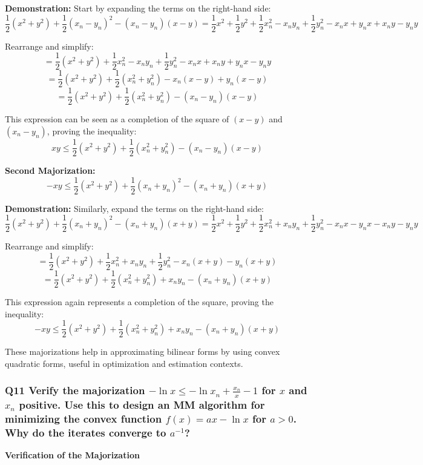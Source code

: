 \documentclass[8pt]{article}
\begin{document}
{\textbf{Demonstration:}
Start by expanding the terms on the right-hand side:
\[
\frac{1}{2} (x^2 + y^2) + \frac{1}{2} (x_n - y_n)^2 - (x_n - y_n)(x - y) = \frac{1}{2} x^2 + \frac{1}{2} y^2 + \frac{1}{2} x_n^2 - x_ny_n + \frac{1}{2} y_n^2 - x_nx + y_nx + x_ny - y_ny
\]

Rearrange and simplify:
\[
= \frac{1}{2} (x^2 + y^2) + \frac{1}{2} x_n^2 - x_ny_n + \frac{1}{2} y_n^2 - x_nx + x_ny + y_nx - y_ny
\]
\[
= \frac{1}{2} (x^2 + y^2) + \frac{1}{2} (x_n^2 + y_n^2) - x_n(x - y) + y_n(x - y)
\]
\[
= \frac{1}{2} (x^2 + y^2) + \frac{1}{2} (x_n^2 + y_n^2) - (x_n - y_n)(x - y)
\]

This expression can be seen as a completion of the square of \( (x - y) \) and \( (x_n - y_n) \), proving the inequality:
\[
xy \leq \frac{1}{2} (x^2 + y^2) + \frac{1}{2} (x_n^2 + y_n^2) - (x_n - y_n)(x - y)
\]

\textbf{Second Majorization:}
\[
-xy \leq \frac{1}{2} (x^2 + y^2) + \frac{1}{2} (x_n + y_n)^2 - (x_n + y_n)(x + y)
\]

\textbf{Demonstration:}
Similarly, expand the terms on the right-hand side:
\[
\frac{1}{2} (x^2 + y^2) + \frac{1}{2} (x_n + y_n)^2 - (x_n + y_n)(x + y) = \frac{1}{2} x^2 + \frac{1}{2} y^2 + \frac{1}{2} x_n^2 + x_ny_n + \frac{1}{2} y_n^2 - x_nx - y_nx - x_ny - y_ny
\]

Rearrange and simplify:
\[
= \frac{1}{2} (x^2 + y^2) + \frac{1}{2} x_n^2 + x_ny_n + \frac{1}{2} y_n^2 - x_n(x + y) - y_n(x + y)
\]
\[
= \frac{1}{2} (x^2 + y^2) + \frac{1}{2} (x_n^2 + y_n^2) + x_ny_n - (x_n + y_n)(x + y)
\]

This expression again represents a completion of the square, proving the inequality:
\[
-xy \leq \frac{1}{2} (x^2 + y^2) + \frac{1}{2} (x_n^2 + y_n^2) + x_ny_n - (x_n + y_n)(x + y)
\]

These majorizations help in approximating bilinear forms by using convex quadratic forms, useful in optimization and estimation contexts.

\subsubsection*{Q11 Verify the majorization \(- \ln x \leq - \ln x_n + \frac{x_n}{x} - 1\) for \(x\) and \(x_n\) positive. Use this to design an MM algorithm for minimizing the convex function \(f(x) = ax - \ln x\) for \(a > 0\). Why do the iterates converge to \(a^{-1}\)?}

\textbf{Verification of the Majorization}

}
\end{document}
